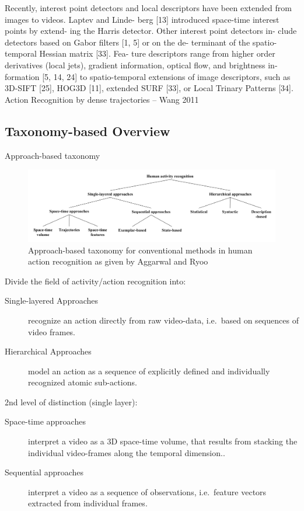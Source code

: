 Recently, interest point detectors and local descriptors have
been extended from images to videos. Laptev and Linde-
berg [13] introduced space-time interest points by extend-
ing the Harris detector. Other interest point detectors in-
clude detectors based on Gabor filters [1, 5] or on the de-
terminant of the spatio-temporal Hessian matrix [33]. Fea-
ture descriptors range from higher order derivatives (local
jets), gradient information, optical flow, and brightness in-
formation [5, 14, 24] to spatio-temporal extensions of image descriptors, such as 3D-SIFT [25], HOG3D [11], extended
SURF [33], or Local Trinary Patterns [34]. Action Recognition by dense trajectories -- Wang 2011


\subsection{Taxonomy-based Overview}

Approach-based taxonomy

\begin{figure}[H]
    \centering
    \includegraphics[width=\textwidth]{img_conventional/taxonomy_conventional_methods.png}
    \caption{Approach-based taxonomy for conventional methods in human action recognition as given by Aggarwal and Ryoo \cite{aggarwal_human_2011}}
    \label{fig:conventional_taxonomy}
\end{figure}

Divide the field of activity/action recognition into:
\begin{description}
    \item[Single-layered Approaches] recognize an action directly from raw video-data, i.e.\ based on sequences of video frames.
    \item[Hierarchical Approaches] model an action as a sequence of explicitly defined and individually recognized atomic sub-actions.
\end{description}

2nd level of distinction (single layer):
\begin{description}
    \item[Space-time approaches] interpret a video as a 3D space-time volume, that results from stacking the individual video-frames along the temporal dimension..
    \item[Sequential approaches] interpret a video as a sequence of observations, i.e.\ feature vectors extracted from individual frames.
\end{description}

